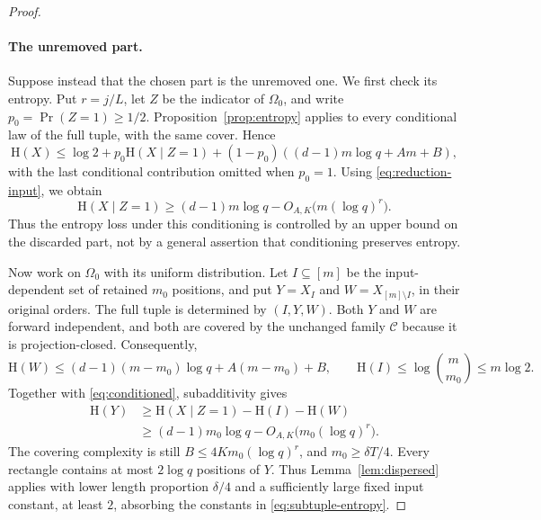 \documentclass[11pt,a4paper]{article}
\numberwithin{equation}{section}
\newcommand{\HH}{\mathrm H}
\newcommand{\cC}{\mathcal C}
\begin{document}
\begin{proof}
\paragraph{The unremoved part.}
Suppose instead that the chosen part is the unremoved one.
We first check its entropy.
Put $r=j/L$, let $Z$ be the indicator of $\Omega_0$, and write
$p_0=\Pr(Z=1)\ge1/2$.
Proposition~\ref{prop:entropy} applies to every conditional law
of the full tuple, with the same cover. Hence
\[
 \HH(X)\le\log2+p_0\HH(X\mid Z=1)
 +(1-p_0)((d-1)m\log q+Am+B),
\]
with the last conditional contribution omitted when $p_0=1$.
Using \eqref{eq:reduction-input}, we obtain
\begin{equation}\label{eq:conditioned}
 \HH(X\mid Z=1)
 \ge(d-1)m\log q-O_{A,K}\bigl(m(\log q)^r\bigr).
\end{equation}
Thus the entropy loss under this conditioning is controlled by
an upper bound on the discarded part, not by a general assertion
that conditioning preserves entropy.

Now work on $\Omega_0$ with its uniform distribution.
Let $I\subseteq[m]$ be the input-dependent set of retained
$m_0$ positions, and put $Y=X_I$ and
$W=X_{[m]\setminus I}$, in their original orders.
The full tuple is determined by $(I,Y,W)$.
Both $Y$ and $W$ are forward independent, and both are covered
by the unchanged family $\cC$ because it is projection-closed.
Consequently,
\[
 \HH(W)\le(d-1)(m-m_0)\log q+A(m-m_0)+B,
 \qquad \HH(I)\le\log\binom m{m_0}\le m\log2.
\]
Together with \eqref{eq:conditioned}, subadditivity gives
\begin{equation}\label{eq:subtuple-entropy}
 \begin{aligned}
 \HH(Y)
 &\ge\HH(X\mid Z=1)-\HH(I)-\HH(W)\\
 &\ge(d-1)m_0\log q-O_{A,K}\bigl(m_0(\log q)^r\bigr).
 \end{aligned}
\end{equation}
The covering complexity is still $B\le4Km_0(\log q)^r$,
and $m_0\ge\delta T/4$.
Every rectangle contains at most $2\log q$ positions of $Y$.
Thus Lemma~\ref{lem:dispersed} applies with lower length
proportion $\delta/4$ and a sufficiently large fixed input
constant, at least $2$, absorbing the constants in
\eqref{eq:subtuple-entropy}.


\end{proof}
\end{document}
